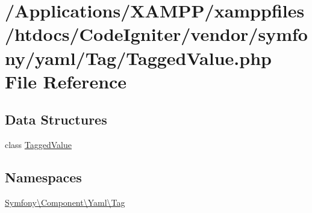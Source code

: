 \hypertarget{_tagged_value_8php}{}\section{/\+Applications/\+X\+A\+M\+P\+P/xamppfiles/htdocs/\+Code\+Igniter/vendor/symfony/yaml/\+Tag/\+Tagged\+Value.php File Reference}
\label{_tagged_value_8php}
\subsection*{Data Structures}
\begin{DoxyCompactItemize}
\item 
class \mbox{\hyperlink{class_symfony_1_1_component_1_1_yaml_1_1_tag_1_1_tagged_value}{Tagged\+Value}}
\end{DoxyCompactItemize}
\subsection*{Namespaces}
\begin{DoxyCompactItemize}
\item 
 \mbox{\hyperlink{namespace_symfony_1_1_component_1_1_yaml_1_1_tag}{Symfony\textbackslash{}\+Component\textbackslash{}\+Yaml\textbackslash{}\+Tag}}
\end{DoxyCompactItemize}
